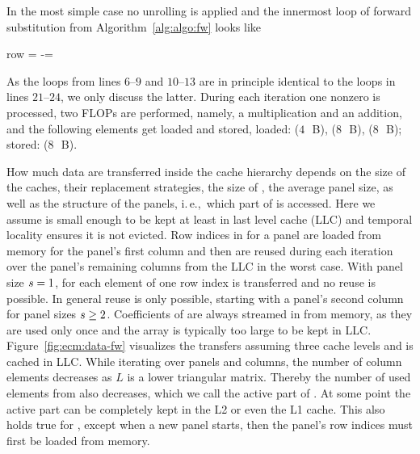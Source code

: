 In the most simple case no unrolling is applied and the innermost loop of
forward substitution from Algorithm~\ref{alg:algo:fw} looks like
%
\begin{algorithmic}[1]
  \setcounter{ALG@line}{20}
      \State row = \nindx[i++]
      \State \nr[row] -= \nr[j] \nlnz[k]
  \EndFor
\end{algorithmic}%
\noindent%
%
As the loops from lines $6$--$9$ and $10$--$13$ are in principle identical to
the loops in lines $21$--$24$, we only discuss the latter.
%
During each iteration one nonzero is processed, two FLOPs are performed,
namely, a multiplication and an addition, and the following elements get
loaded and stored, loaded: \vindx{} ($4$~\,B), \vr{} ($8$~\,B), \vlnz{}
($8$~\,B); stored: \vr{} ($8$~\,B).

How much data are transferred inside the cache hierarchy depends on the size of
the caches, their replacement strategies, the size of \vr{}, the average panel
size, as well as the structure of the panels, i.\,e.,\ which part of \vr{} is
accessed.
Here we assume \vr{} is small enough to be kept at least in last level cache
(LLC) and temporal locality ensures it is not evicted.
%
Row indices in \vindx{} for a panel are loaded from memory for the panel's first
column and then are reused during each iteration over the panel's remaining
columns from the LLC in the worst case.
With panel size $s=1$, for each element of \vlnz{} one row index is
transferred and no reuse is possible.
In general reuse is only possible, starting with a panel's second column for
panel sizes $s \ge 2$.
%
Coefficients of \vlnz{} are always streamed in from memory, as they are
used only once and the array \vlnz{} is typically too large to be kept in LLC.
Figure~\ref{fig:ecm:data-fw} visualizes the transfers assuming three cache levels
and \vr{} is cached in LLC.
While iterating over panels and columns, the number of column elements
decreases as $L$ is a lower triangular matrix.
Thereby the number of used elements from \vr{} also decreases, which we call the
active part of \vr{}.
At some point the active part can be completely kept in the L2 or even the L1 cache.
This also holds true for \vindx{}, except when a new panel starts, then
the panel's row indices must first be loaded from memory.

